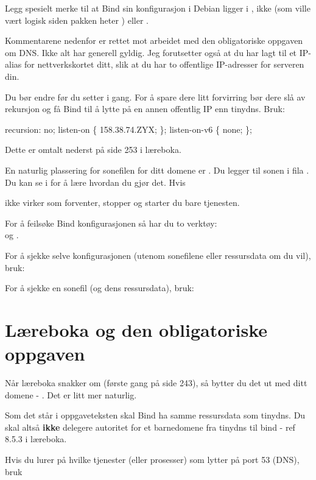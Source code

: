 Legg spesielt merke til at Bind sin konfigurasjon i Debian ligger i , 
ikke  (som ville vært logisk siden pakken heter ) 
eller . 

Kommentarene nedenfor er rettet mot arbeidet med den obligatoriske oppgaven
om DNS. Ikke alt har generell gyldig. Jeg forutsetter også at du har lagt
til et IP-alias for nettverkskortet ditt, slik at du har to offentlige IP-adresser
for serveren din. 

Du bør endre  før du setter i gang.
For å spare dere litt forvirring bør dere slå av rekursjon og få Bind til å lytte 
på en annen offentlig IP enn tinydns. Bruk:

\begin{filedata}
recursion: no;
listen-on \{ 158.38.74.ZYX; \};
listen-on-v6 \{ none; \};
\end{filedata}

Dette er omtalt nederst på side 253 i læreboka. 

En naturlig plassering for sonefilen for ditt domene er 
.  
Du legger til sonen i fila . 
Du kan se i  for 
å lære hvordan du gjør det. Hvis 


ikke virker som forventer, stopper og starter du bare tjenesten.

For å feilsøke Bind konfigurasjonen så har du to verktøy: \\ 
 og .

For å sjekke selve konfigurasjonen (utenom sonefilene eller ressursdata om du vil), bruk:


For å sjekke en sonefil (og dens ressursdata), bruk:


\section{Læreboka og den obligatoriske oppgaven}

Når læreboka snakker om  (første gang på side 243),
så bytter du det ut med ditt domene - . Det er litt 
mer naturlig.

Som det står i oppgaveteksten skal Bind ha samme ressursdata som
tinydns. Du skal altså \textbf{ikke} delegere autoritet for et barnedomene fra
tinydns til bind - ref 8.5.3 i læreboka.

Hvis du lurer på hvilke tjenester (eller prosesser)
som lytter på port 53 (DNS), bruk



